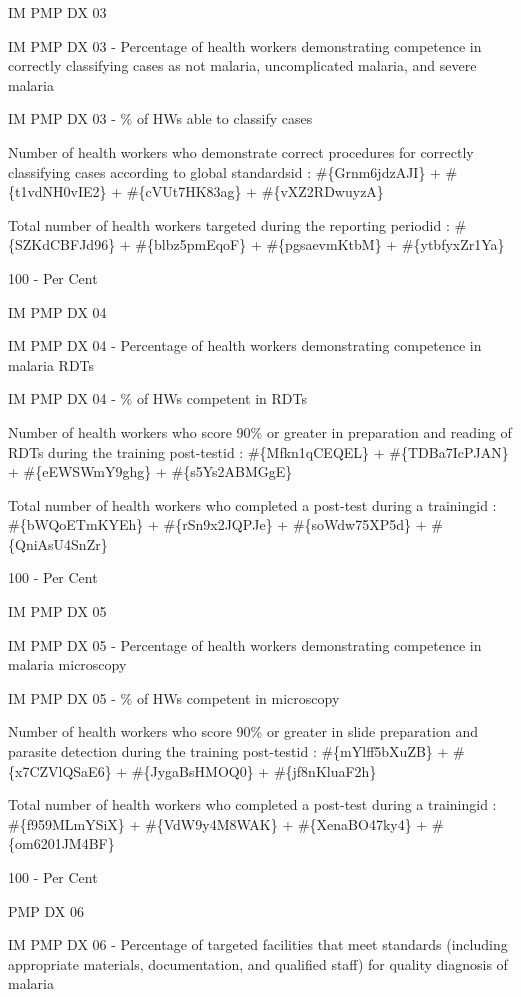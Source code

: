 \documentclass[]{book}
\begin{document}
IM PMP DX 03

IM PMP DX 03 - Percentage of health workers demonstrating competence in correctly classifying cases as not malaria, uncomplicated malaria, and severe malaria

IM PMP DX 03 - \% of HWs able to classify cases

Number of health workers who demonstrate correct procedures for correctly classifying cases according to global standardsid : \#\{Grnm6jdzAJI\} + \#\{t1vdNH0vIE2\} + \#\{cVUt7HK83ag\} + \#\{vXZ2RDwuyzA\}

Total number of health workers targeted during the reporting periodid : \#\{SZKdCBFJd96\} + \#\{blbz5pmEqoF\} + \#\{pgsaevmKtbM\} + \#\{ytbfyxZr1Ya\}

100 - Per Cent

IM PMP DX 04

IM PMP DX 04 - Percentage of health workers demonstrating competence in malaria RDTs

IM PMP DX 04 - \% of HWs competent in RDTs

Number of health workers who score 90\% or greater in preparation and reading of RDTs during the training post-testid : \#\{Mfkn1qCEQEL\} + \#\{TDBa7IcPJAN\} + \#\{eEWSWmY9ghg\} + \#\{s5Ys2ABMGgE\}

Total number of health workers who completed a post-test during a trainingid : \#\{bWQoETmKYEh\} + \#\{rSn9x2JQPJe\} + \#\{soWdw75XP5d\} + \#\{QniAsU4SnZr\}

100 - Per Cent

IM PMP DX 05

IM PMP DX 05 - Percentage of health workers demonstrating competence in malaria microscopy

IM PMP DX 05 - \% of HWs competent in microscopy

Number of health workers who score 90\% or greater in slide preparation and parasite detection during the training post-testid : \#\{mYlff5bXuZB\} + \#\{x7CZVlQSaE6\} + \#\{JygaBsHMOQ0\} + \#\{jf8nKluaF2h\}

Total number of health workers who completed a post-test during a trainingid : \#\{f959MLmYSiX\} + \#\{VdW9y4M8WAK\} + \#\{XenaBO47ky4\} + \#\{om6201JM4BF\}

100 - Per Cent

PMP DX 06

IM PMP DX 06 - Percentage of targeted facilities that meet standards (including appropriate materials, documentation, and qualified staff) for quality diagnosis of malaria
\end{document}
